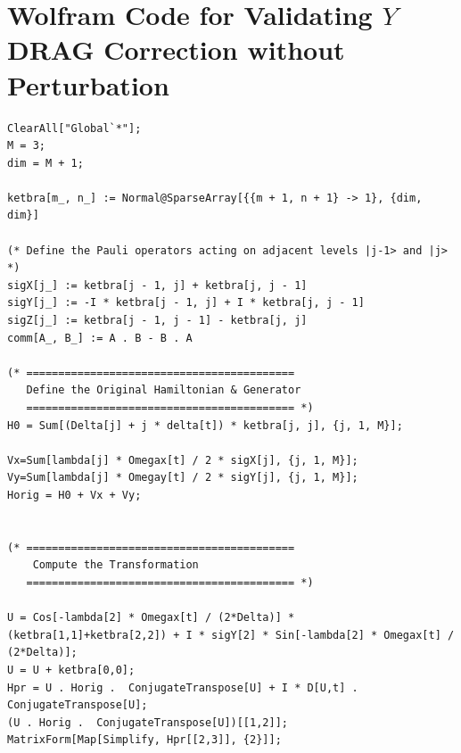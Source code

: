 \section{Wolfram Code for Validating $Y$ DRAG Correction without Perturbation}
\begin{lstlisting}
ClearAll["Global`*"];
M = 3;
dim = M + 1;

ketbra[m_, n_] := Normal@SparseArray[{{m + 1, n + 1} -> 1}, {dim, dim}]

(* Define the Pauli operators acting on adjacent levels |j-1> and |j> *)
sigX[j_] := ketbra[j - 1, j] + ketbra[j, j - 1]
sigY[j_] := -I * ketbra[j - 1, j] + I * ketbra[j, j - 1]
sigZ[j_] := ketbra[j - 1, j - 1] - ketbra[j, j]
comm[A_, B_] := A . B - B . A

(* ==========================================
   Define the Original Hamiltonian & Generator
   ========================================== *)
H0 = Sum[(Delta[j] + j * delta[t]) * ketbra[j, j], {j, 1, M}];

Vx=Sum[lambda[j] * Omegax[t] / 2 * sigX[j], {j, 1, M}];
Vy=Sum[lambda[j] * Omegay[t] / 2 * sigY[j], {j, 1, M}];
Horig = H0 + Vx + Vy;


(* ==========================================
    Compute the Transformation
   ========================================== *)

U = Cos[-lambda[2] * Omegax[t] / (2*Delta)] * (ketbra[1,1]+ketbra[2,2]) + I * sigY[2] * Sin[-lambda[2] * Omegax[t] / (2*Delta)];
U = U + ketbra[0,0];
Hpr = U . Horig .  ConjugateTranspose[U] + I * D[U,t] . ConjugateTranspose[U];
(U . Horig .  ConjugateTranspose[U])[[1,2]];
MatrixForm[Map[Simplify, Hpr[[2,3]], {2}]];

\end{lstlisting}
